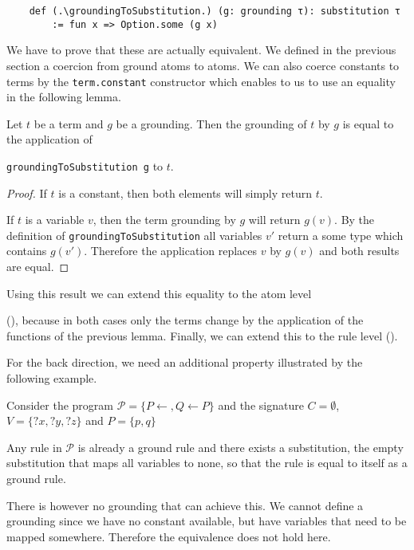     \begin{lstlisting}
    def (.\groundingToSubstitution.) (g: grounding τ): substitution τ
        := fun x => Option.some (g x)
    \end{lstlisting}

    We have to prove that these are actually equivalent. We defined in the previous section a coercion from ground atoms to atoms. We can also coerce constants to terms by the \lstinline|term.constant| constructor which enables to us to use an equality in the following lemma.

    \begin{lemma}[\groundingToSubsitutionEquivTerm]
        Let $t$ be a term and $g$ be a grounding. Then the grounding of $t$ by $g$ is equal to the application of
        
        \lstinline|groundingToSubstitution g| to $t$.
    \end{lemma}
    \begin{proof}
        If $t$ is a constant, then both elements will simply return $t$.

        If $t$ is a variable $v$, then the term grounding by $g$ will return $g(v)$. By the definition of \lstinline|groundingToSubstitution| all variables $v'$ return a some type which contains $g(v')$. Therefore the application replaces $v$ by $g(v)$ and both results are equal. 
    \end{proof}

    Using this result we can extend this equality to the atom level 
    
    (\groundingToSubsitutionEquivAtom), because in both cases only the terms change by the application of the functions of the previous lemma. Finally, we can extend this to the rule level (\groundingToSubsitutionEquivRule).

    For the back direction, we need an additional property illustrated by the following example.
    \begin{example}
        Consider the program $\mathcal{P} = \{P \leftarrow, Q \leftarrow P\}$ and the signature $C = \emptyset$, $V = \{?x,?y,?z \}$ and $P = \{p,q\}$

        Any rule in $\mathcal{P}$ is already a ground rule and there exists a substitution, the empty substitution that maps all variables to none, so that the rule is equal to itself as a ground rule.
        
        There is however no grounding that can achieve this. We cannot define a grounding since we have no constant available, but have variables that need to be mapped somewhere. Therefore the equivalence does not hold here.
    \end{example}

